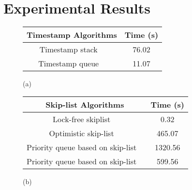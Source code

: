 \section{Experimental Results}
\label{section:experiments}
\newcommand{\emm}{(emm)}
\begin{figure}[]
\center



\begin{tabular}{|c | c | }
  \hline
   \textsf{\textbf{{Timestamp Algorithms}}} &  \textsf{\textbf{{Time (s)}}} \\
\hline
\hline
\textsf{Timestamp stack  ~\cite{MS:QueueAlgorithms}}\;\;\;\;\;\;  & \textsf{76.02} \\
\hline
\textsf{Timestamp queue  ~\cite{MS:QueueAlgorithms}}& \textsf{11.07} \\
\hline
\end{tabular}

\vspace*{0.1cm}

(a)
\\
\vspace*{0.5cm}

\begin{tabular}{|c | c | }
  \hline
   \textsf{\textbf{{Skip-list Algorithms}}} &  \textsf{\textbf{{Time (s)}}} \\
\hline
\hline
\;\;\;\;\textsf{Lock-free skiplist   ~\cite{ArtOfMpP}}\;\;\;\;\;\;  & \textsf{0.32} \\
\hline
\textsf{Optimistic skip-list  ~\cite{MS:QueueAlgorithms}}& \textsf{465.07} \\
\hline 
\textsf{Priority queue based on skip-list  ~\cite{Shavit:ElimQueue}}  &  \textsf{1320.56} \\
\hline
\textsf{Priority queue based on skip-list  ~\cite{Shavit:ElimQueue}}  &  \textsf{599.56} \\
\hline
\end{tabular}

\vspace*{0.1cm}

(b)
\\
\vspace*{0.5cm}



\end{figure}
